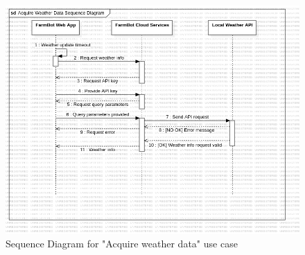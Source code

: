 \begin{figure}[H]
    \centering
    \includegraphics[width=1\textwidth]{UML Diagrams/SequenceDiagram_acquireweatherdata.png}
    \caption{Sequence Diagram for "Acquire weather data" use case}
    \label{fig:acquire-weather-data}
\end{figure}

